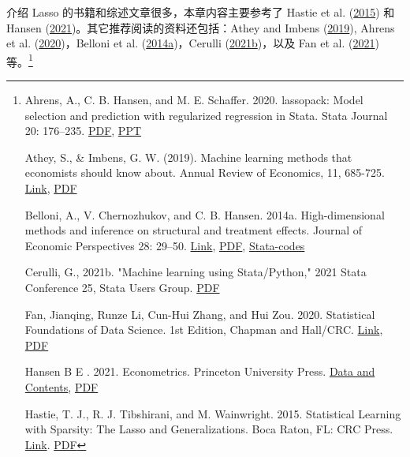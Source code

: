 介绍 Lasso 的书籍和综述文章很多，本章内容主要参考了 Hastie et al. (\href{https://web.stanford.edu/~hastie/StatLearnSparsity_files/SLS.pdf}{2015}) 和 Hansen (\href{https://www.ssc.wisc.edu/~bhansen/econometrics/Econometrics.pdf}{2021})。其它推荐阅读的资料还包括：Athey and Imbens (\href{http://sci-hub.ren/10.1146/annurev-economics-080217-053433}{2019}), Ahrens et al. (\href{http://sci-hub.ren/10.1177/1536867X20909697}{2020})，Belloni et al. (\href{https://doi.org/10.1257/jep.28.2.29}{2014a})，Cerulli (\href{https://arxiv.org/pdf/2103.03122.pdf}{2021b})，以及 Fan et al. (\href{http://sci-hub.ren/10.1201/9780429096280}{2021}) 等。\footnote{%
Ahrens, A., C. B. Hansen, and M. E. Schaffer. 2020. lassopack: Model selection and prediction with regularized regression in Stata. Stata Journal 20: 176–235. \href{http://sci-hub.ren/10.1177/1536867X20909697}{PDF}, \href{https://statalasso.github.io/pdf/StataConference2018_AhrensSchaffer.pdf}{PPT}

Athey, S., \& Imbens, G. W. (2019). Machine learning methods that economists should know about. Annual Review of Economics, 11, 685-725. \href{https://doi.org/10.1146/annurev-economics-080217-053433}{Link}, \href{http://sci-hub.ren/10.1146/annurev-economics-080217-053433}{PDF}

Belloni, A., V. Chernozhukov, and C. B. Hansen. 2014a. High-dimensional methods and inference on structural and
treatment effects. Journal of Economic Perspectives 28: 29–50. \href{https://doi.org/10.1257/jep.28.2.29}{Link}, \href{http://sci-hub.ren/10.1257/jep.28.2.29}{PDF}, \href{https://academic.oup.com/restud/article/81/2/608/1523757}{Stata-codes}

Cerulli, G., 2021b. "Machine learning using Stata/Python," 2021 Stata Conference 25, Stata Users Group. \href{https://arxiv.org/pdf/2103.03122.pdf}{PDF}

Fan, Jianqing, Runze Li, Cun-Hui Zhang, and Hui Zou. 2020. Statistical Foundations of Data Science. 1st Edition, Chapman and Hall/CRC. \href{https://doi.org/10.1201/9780429096280}{Link}, \href{http://sci-hub.ren/10.1201/9780429096280}{PDF}

Hansen B E . 2021. Econometrics. Princeton University Press. \href{https://www.ssc.wisc.edu/~bhansen/econometrics/}{Data and Contents}, \href{https://www.ssc.wisc.edu/~bhansen/econometrics/Econometrics.pdf}{PDF}

Hastie, T. J., R. J. Tibshirani, and M. Wainwright. 2015. Statistical Learning with Sparsity: The Lasso and
Generalizations. Boca Raton, FL: CRC Press. \href{https://web.stanford.edu/~hastie/StatLearnSparsity/}{Link}. \href{https://web.stanford.edu/~hastie/StatLearnSparsity_files/SLS.pdf}{PDF} %
}
\vspace{10pt}

